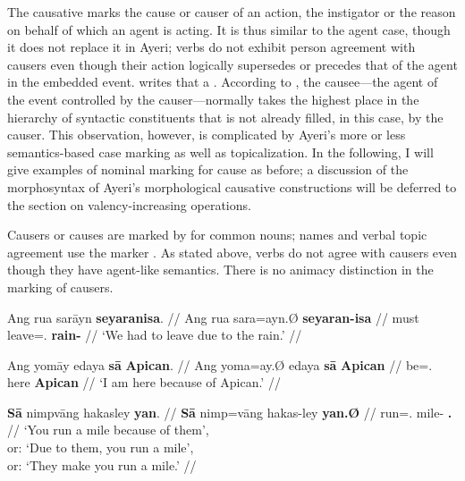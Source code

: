 The causative marks the cause or causer of an action, the instigator or the 
reason on behalf of which an agent is acting. It is thus similar to the agent 
case, though it does not replace it in Ayeri; verbs do not exhibit person 
agreement with causers even though their action logically supersedes or precedes 
that of the agent in the embedded event. \citet{dixon2000} writes that a 
. According 
to \citet[176]{comrie1989}, the causee---the agent of the event controlled by 
the causer---normally takes the highest place in the hierarchy of syntactic 
constituents that is not already filled, in this case, by the causer. This 
observation, however, is complicated by Ayeri's more or less semantics-based 
case marking as well as topicalization. In the following, I will give examples 
of nominal marking for cause as before; a discussion of the morphosyntax of 
Ayeri's morphological causative constructions will be deferred to the section on 
valency-increasing operations.

Causers or causes are marked by  for common nouns; names and 
verbal topic agreement use the marker . As stated above, verbs do 
not agree with causers even though they have agent-like semantics. There is no 
animacy distinction in the marking of causers.

\pex
\a\begingl
	\gla Ang rua sarāyn \textbf{seyaranisa}. //
	\glb Ang rua sara=ayn.Ø \textbf{seyaran-isa} //
	\glc \AgtT{} must leave=\Fpl{}.\Top{} \textbf{rain-\Caus{}} //
	\glft `We had to leave due to the rain.' //
\endgl

\a\begingl
	\gla Ang yomāy edaya \textbf{sā} \textbf{Apican}. //
	\glb Ang yoma=ay.Ø edaya \textbf{sā} \textbf{Apican} //
	\glc \AgtT{} be=\Fsg{}.\Top{} here \textbf{\Caus{}} \textbf{Apican} //
	\glft `I am here because of Apican.' //
\endgl

\a\label{ex:caustop}\begingl
	\gla \textbf{Sā} nimpvāng hakasley \textbf{yan}. //
	\glb \textbf{Sā} nimp=vāng hakas-ley \textbf{yan.Ø} //
	\glc \textbf{\CauT{}} run=\Ssg{}.\Aarg{} mile-\PargI{} 
		\textbf{\TplM{}.\Top{}} //
	\glft `You run a mile because of them',\\
		or: `Due to them, you run a mile',\\
		or: `They make you run a mile.' //
\endgl

\xe

